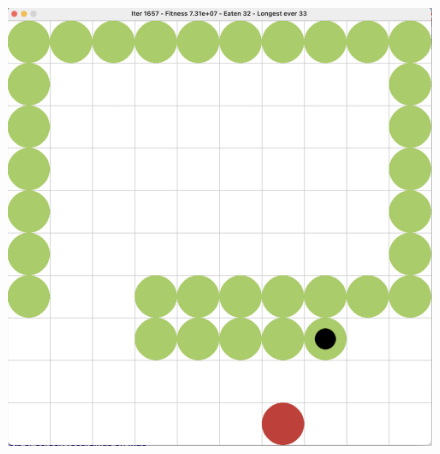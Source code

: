 \documentclass[10pt]{beamer}
\begin{document}
\begin{frame}
\begin{columns}[T]
\begin{column}{0.24\textwidth}
\begin{figure}
\end{figure}  
\begin{figure}
\vspace{-1.1cm}\hspace{-0.6cm}
\includegraphics[width=1\textwidth]{snake_game.png}
\end{figure}
\end{column}
\end{columns}
\end{frame}
\end{document}
